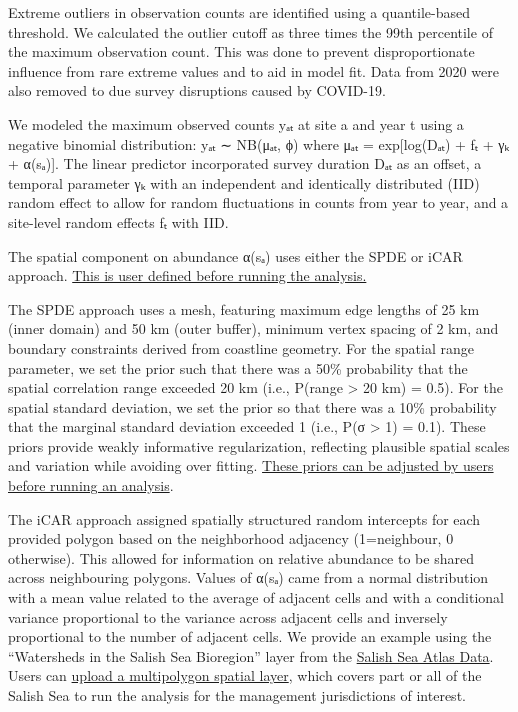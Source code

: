 \documentclass[
  letterpaper,
  DIV=11,
  numbers=noendperiod]{scrreprt}
\begin{document}
Extreme outliers in observation counts are identified using a
quantile-based threshold. We calculated the outlier cutoff as three
times the 99th percentile of the maximum observation count. This was
done to prevent disproportionate influence from rare extreme values and
to aid in model fit. Data from 2020 were also removed to due survey
disruptions caused by COVID-19.

We modeled the maximum observed counts yₐₜ at site a and year t using a
negative binomial distribution: yₐₜ ∼ NB(μₐₜ, ϕ) where μₐₜ =
exp{[}log(Dₐₜ) + fₜ + γₖ + α(sₐ){]}. The linear predictor incorporated
survey duration Dₐₜ as an offset, a temporal parameter γₖ with an
independent and identically distributed (IID) random effect to allow for
random fluctuations in counts from year to year, and a site-level random
effects fₜ with IID.

The spatial component on abundance α(sₐ) uses either the SPDE or iCAR
approach. \hyperref[3.1Analysis]{This is user defined before running the
analysis.}

The SPDE approach uses a mesh, featuring maximum edge lengths of 25 km
(inner domain) and 50 km (outer buffer), minimum vertex spacing of 2 km,
and boundary constraints derived from coastline geometry. For the
spatial range parameter, we set the prior such that there was a 50\%
probability that the spatial correlation range exceeded 20 km (i.e.,
P(range \textgreater{} 20 km) = 0.5). For the spatial standard
deviation, we set the prior so that there was a 10\% probability that
the marginal standard deviation exceeded 1 (i.e., P(σ \textgreater{} 1)
= 0.1). These priors provide weakly informative regularization,
reflecting plausible spatial scales and variation while avoiding over
fitting. \hyperref[3.1SPDE]{These priors can be adjusted by users before
running an analysis}.

The iCAR approach assigned spatially structured random intercepts for
each provided polygon based on the neighborhood adjacency (1=neighbour,
0 otherwise). This allowed for information on relative abundance to be
shared across neighbouring polygons. Values of α(sₐ) came from a normal
distribution with a mean value related to the average of adjacent cells
and with a conditional variance proportional to the variance across
adjacent cells and inversely proportional to the number of adjacent
cells. We provide an example using the ``Watersheds in the Salish Sea
Bioregion'' layer from the
\href{https://salish-sea-atlas-data-wwu.hub.arcgis.com/}{Salish Sea
Atlas Data}. Users can \hyperref[3.1Analysis]{upload a multipolygon
spatial layer}, which covers part or all of the Salish Sea to run the
analysis for the management jurisdictions of interest.
\end{document}
